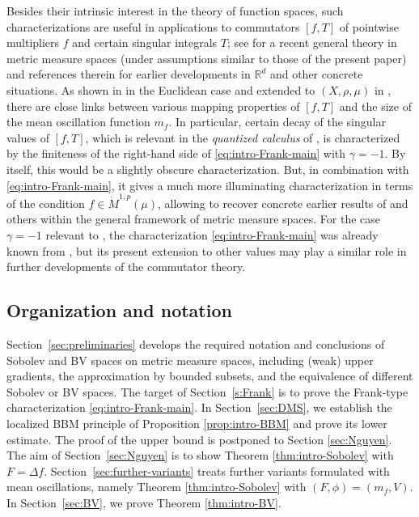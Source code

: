 \documentclass[11pt]{amsart}
\theoremstyle{definition}
\theoremstyle{remark}
\numberwithin{equation}{section}
\begin{document}
Besides their intrinsic interest in the theory of function spaces, such characterizations
are
useful in applications to commutators $[f,T]$ of pointwise multipliers $f$ and
certain singular integrals $T$; see \cite{Hyt:Sp} for a recent general theory in
metric measure spaces (under assumptions similar to those of the present paper) and
references
therein for earlier developments in $\mathbb R^d$ and other concrete situations. As shown in
\cite{RS:NWO}
in the Euclidean case and extended to $(X,\rho,\mu)$ in \cite{Hyt:Sp}, there are close links
between various mapping properties of $[f,T]$ and the size of the mean oscillation function
$m_f$.
In particular, certain decay of the singular values of $[f,T]$, which is relevant in the
{\em quantized calculus} of \cite{Connes:book}, is characterized by the finiteness of the
right-hand side of \eqref{eq:intro-Frank-main} with $\gamma=-1$. By itself, this would be a
slightly  obscure characterization. But, in combination with \eqref{eq:intro-Frank-main},
it gives a much more illuminating characterization in terms of the condition
$f\in\dot M^{1,p}(\mu)$, allowing \cite{Hyt:Sp} to recover concrete earlier results of
\cite{CST,LMSZ} and others within the general framework of metric measure spaces.
For the case $\gamma=-1$ relevant to \cite{Hyt:Sp}, the characterization
\eqref{eq:intro-Frank-main}
was already known from \cite{HK:W1p}, but its present extension to other values
may play a similar role in further developments of the commutator theory.

\subsection{Organization and notation}

Section~\ref{sec:preliminaries} develops the required notation
and conclusions of Sobolev and BV spaces on metric measure spaces, including
(weak) upper gradients, the approximation by bounded subsets, and the
equivalence of different Sobolev or BV spaces.  The target of
Section~\ref{s:Frank} is to prove the Frank-type
characterization \eqref{eq:intro-Frank-main}.
In Section~\ref{sec:DMS}, we establish the localized BBM
principle of Proposition \ref{prop:intro-BBM} and prove its lower estimate.
The proof of the upper bound is postponed to Section \ref{sec:Nguyen}.
The aim of Section~\ref{sec:Nguyen} is to show Theorem \ref{thm:intro-Sobolev}
with $F=\Delta f$.
Section~\ref{sec:further-variants} treats further variants formulated with
mean oscillations, namely Theorem \ref{thm:intro-Sobolev} with
$(F,\phi)=(m_f,V)$.
In Section~\ref{sec:BV}, we prove Theorem \ref{thm:intro-BV}.
\end{document}
